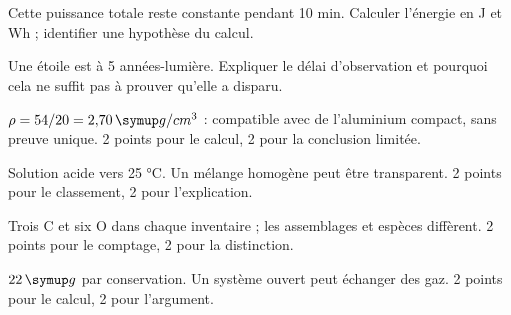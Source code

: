 \par\noindent\begin{minipage}{\linewidth}
Cette puissance totale reste constante pendant 10 min. Calculer l’énergie en J et Wh ; identifier une hypothèse du calcul.\par
\end{minipage}\par
\par\noindent\begin{minipage}{\linewidth}
Une étoile est à 5 années-lumière. Expliquer le délai d’observation et pourquoi cela ne suffit pas à prouver qu’elle a disparu.\par
\end{minipage}\par
{}\pcGrille{}
\label{cor-B1}
\label{cor-bilans}
\par\noindent\begin{minipage}{\linewidth}
$\rho=54/20=2{,}70\unite{g/cm^3}$ : compatible avec de l’aluminium compact, sans preuve unique. 2 points pour le calcul, 2 pour la conclusion limitée.\par
\end{minipage}\par
\par\noindent\begin{minipage}{\linewidth}
Solution acide vers 25 °C. Un mélange homogène peut être transparent. 2 points pour le classement, 2 pour l’explication.\par
\end{minipage}\par
\par\noindent\begin{minipage}{\linewidth}
Trois C et six O dans chaque inventaire ; les assemblages et espèces diffèrent. 2 points pour le comptage, 2 pour la distinction.\par
\end{minipage}\par
\par\noindent\begin{minipage}{\linewidth}
$22\unite g$ par conservation. Un système ouvert peut échanger des gaz. 2 points pour le calcul, 2 pour l’argument.\par
\end{minipage}\par
